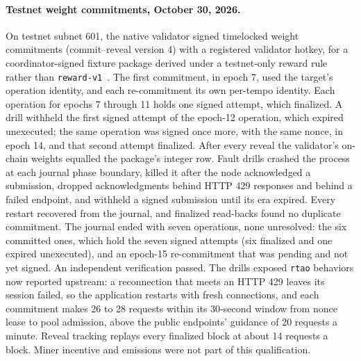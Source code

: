 \paragraph{Testnet weight commitments, October 30, 2026.}\label{testnet-m2}
On testnet subnet 601, the native validator signed timelocked weight
commitments (commit--reveal version 4) with a registered validator hotkey, for a
coordinator-signed fixture package derived under a testnet-only reward rule
rather than \texttt{reward-v1}~\cite{testnetm2}. The first commitment, in
epoch 7, used the target's operation identity, and each re-commitment its own
per-tempo identity. Each operation for epochs 7 through 11 holds one signed
attempt, which finalized. A drill withheld the first signed attempt of the
epoch-12 operation, which expired unexecuted; the same operation was signed
once more, with the same nonce, in epoch 14, and that second attempt
finalized. After
every reveal the validator's on-chain weights equalled the package's integer
row. Fault drills crashed the process at each journal phase boundary, killed it
after the node acknowledged a submission, dropped acknowledgments behind HTTP
429 responses and behind a failed endpoint, and withheld a signed submission
until its era expired. Every restart recovered from the journal, and finalized
read-backs found no duplicate commitment. The journal ended with seven
operations, none unresolved: the six committed ones, which hold the seven
signed attempts (six finalized and one expired unexecuted), and an epoch-15
re-commitment that was pending and not yet signed. An independent verification
passed. The drills exposed \texttt{rtao} behaviors now reported upstream: a
reconnection that meets an HTTP 429 leaves its session failed, so the
application restarts with fresh connections, and each commitment makes 26 to 28
requests within its 30-second window from nonce lease to pool admission, above
the public endpoints' guidance of 20 requests a minute.
Reveal tracking replays every finalized block at about 14 requests a block.
Miner incentive and emissions were not part of this qualification.


